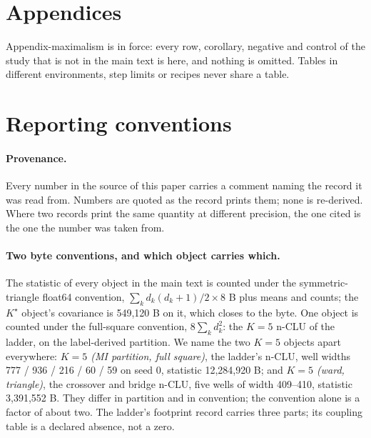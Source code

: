 \documentclass{article} %
\newcommand{\Kstar}{\ensuremath{K^{\star}}}
\begin{document}

\clearpage
\appendix
\section*{Appendices}
Appendix-maximalism is in force: every row, corollary, negative and control of the study that
is not in the main text is here, and nothing is omitted. Tables in different environments,
step limits or recipes never share a table.

\section{Reporting conventions}
\label{app:conventions}

\paragraph{Provenance.} Every number in the source of this paper carries a comment naming the
record it was read from. Numbers are quoted as the record prints them; none is re-derived.
Where two records print the same quantity at different precision, the one cited is the one the
number was taken from.

\paragraph{Two byte conventions, and which object carries which.} The statistic of every object
in the main text is counted under the symmetric-triangle float64 convention,
$\sum_k d_k(d_k+1)/2\times8$ B plus means and counts; the $\Kstar$ object's covariance is
549,120 B on it, which closes to the byte. %
One object is counted under the full-square convention, $8\sum_k d_k^2$: the $K=5$ n-CLU of the
ladder, on the label-derived partition. We name the two $K=5$ objects apart everywhere:
\emph{$K=5$ (MI partition, full square)}, the ladder's n-CLU, well widths 777 / 936 / 216 / 60 /
59 on seed 0, statistic 12,284,920 B; and \emph{$K=5$ (ward, triangle)}, the crossover and
bridge n-CLU, five wells of width 409--410, statistic 3,391,552 B. They differ in partition and
in convention; the convention alone is a factor of about two.
The ladder's footprint record carries three parts; its coupling table is a declared absence, not a
zero. %
\end{document}
